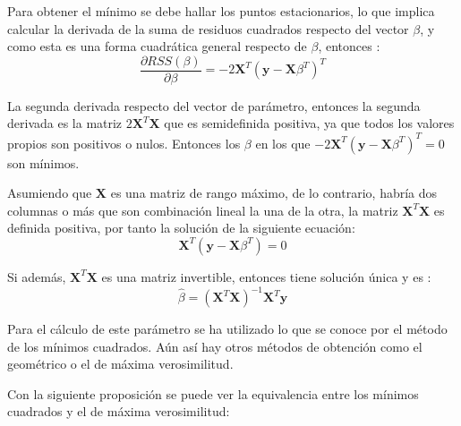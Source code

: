 \noindent Para obtener el mínimo se debe hallar los puntos estacionarios, lo que implica calcular la derivada de la suma de residuos cuadrados respecto del vector $\beta$, y como esta es una forma cuadrática general respecto de $\beta$, entonces \cite{Morrison 1976}:
\begin{equation}
\dfrac{\partial RSS(\beta)}{\partial \beta}= -2\mathbf{X}^T(\mathbf{y}-\mathbf{X}\beta^T)^T
\end{equation}

\noindent La segunda derivada respecto del vector de parámetro, entonces la segunda derivada es la matriz $2\mathbf{X}^T\mathbf{X}$ que es semidefinida positiva, ya que todos los valores propios son positivos o nulos. Entonces los $\beta$ en los que $-2\mathbf{X}^T(\mathbf{y}-\mathbf{X}\beta^T)^T=0$ son mínimos.  

\noindent Asumiendo que $\textbf{X}$ es una matriz de rango máximo, de lo contrario, habría dos columnas o más que son combinación lineal la una de la otra, la matriz $\textbf{X}^T\textbf{X}$ es definida positiva, por tanto la solución de la siguiente ecuación:
\begin{equation}
\textbf{X}^T(\textbf{y}-\textbf{X}\beta^T)=0
\end{equation}

\noindent Si además, $\textbf{X}^T\textbf{X}$ es una matriz invertible, entonces tiene solución única y es :
\begin{equation}
\hat{\beta}=(\textbf{X}^T\textbf{X})^{-1}\textbf{X}^T\textbf{y}
\end{equation}

\noindent Para el cálculo de este parámetro se ha utilizado lo que se conoce por el método de los mínimos cuadrados. Aún así hay otros métodos de obtención como el geométrico o el de máxima verosimilitud. 

\noindent Con la siguiente proposición se puede ver la equivalencia entre los mínimos cuadrados y el de máxima verosimilitud:

